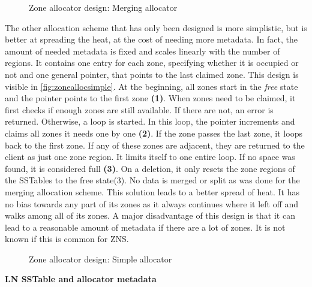 \begin{figure}[h]
\centering
\begin{minipage}{0.75\textwidth}
  \centering
  
\end{minipage}%
\caption{ Zone allocator design: Merging allocator }
\label{fig:zoneallocmerging}
\end{figure}

The other allocation scheme that has only been designed is more simplistic, but is better at spreading the heat, at the cost of needing more metadata. In fact, the amount of needed metadata is fixed and scales linearly with the number of regions. It contains one entry for each zone, specifying whether it is occupied or not and one general pointer, that points to the last claimed zone. This design is visible in \autoref{fig:zoneallocsimple}. At the beginning, all zones start in the \textit{free} state and the pointer points to the first zone \textbf{(1)}. When zones need to be claimed, it first checks if enough zones are still available. If there are not, an error is returned. Otherwise, a loop is started. In this loop, the pointer increments and claims all zones it needs one by one \textbf{(2)}. If the zone passes the last zone, it loops back to the first zone. If any of these zones are adjacent, they are returned to the client as just one zone region. It limits itself to one entire loop. If no space was found, it is considered full \textbf{(3)}. On a deletion, it only resets the zone regions of the SSTables to the free state(3). No data is merged or split as was done for the merging allocation scheme. This solution leads to a better spread of heat. It has no bias towards any part of its zones as it always continues where it left off and walks among all of its zones. A major disadvantage of this design is that it can lead to a reasonable amount of metadata if there are a lot of zones. It is not known if this is common for ZNS.\\
\begin{figure}[h]
\centering
\begin{minipage}{0.75\textwidth}
  \centering
  
\end{minipage}%
\caption{ Zone allocator design: Simple allocator }
\label{fig:zoneallocsimple}
\end{figure}
\textbf{LN SSTable and allocator metadata}\\
